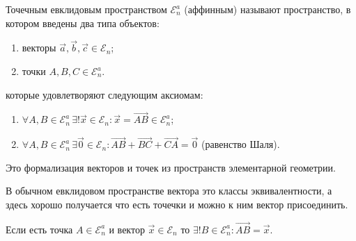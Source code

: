 \begin{definition}
  Точечным евклидовым пространством $\mathcal{E}_n^a$ (аффинным) называют пространство, в котором
  введены два типа объектов:
  \begin{enumerate}
    \item векторы $\vec{a}, \vec{b}, \vec{c} \in \mathcal{E}_n$;
    \item точки $A, B, C \in \mathcal{E}_n^a$.
  \end{enumerate}
  которые удовлетворяют следующим аксиомам:
  \begin{enumerate}
    \item $\forall A, B \in \mathcal{E}_n^a \, \exists! \vec{x} \in \mathcal{E}_n : \vec{x} = \vec{AB} \in \mathcal{E}_n^a$;
    \item $\forall A, B \in \mathcal{E}_n^a \, \exists \vec{0} \in \mathcal{E}_n : \vec{AB} + \vec{BC} + \vec{CA} = \vec{0}$ (равенство Шаля).
  \end{enumerate}
  Это формализация векторов и точек из пространств элементарной геометрии.
\end{definition}

В обычном евклидовом пространстве вектора это классы эквивалентности, а здесь хорошо получается 
что есть точечки и можно к ним вектор присоединить.

Если есть точка $A \in \mathcal{E}_n^a$ и вектор $\vec{x} \in \mathcal{E}_n$ то $\exists! B \in \mathcal{E}_n^a : \vec{AB} = \vec{x}$.

